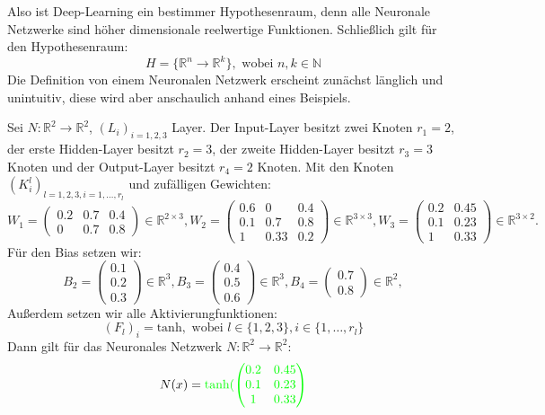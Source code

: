 \documentclass[12pt,letterpaper,ngerman]{article}
\begin{document}
Also ist Deep-Learning ein bestimmer Hypothesenraum, denn 
alle Neuronale Netzwerke sind höher dimensionale reelwertige Funktionen. 
Schließlich gilt für den Hypothesenraum:
\[
  H = \{\mathbb{R}^n \to \mathbb{R}^k\}, \text{ wobei } n,k \in \mathbb{N}
\]
Die Definition von einem Neuronalen Netzwerk erscheint zunächst länglich und unintuitiv, diese
wird aber anschaulich anhand eines Beispiels.
\begin{example}
  Sei $N: \mathbb{R}^2 \to \mathbb{R}^2$, $(L_i)_{i=1,2,3}$ Layer.
  Der Input-Layer besitzt zwei Knoten $r_1 = 2$, der erste
  Hidden-Layer besitzt $r_2 = 3$, der zweite Hidden-Layer besitzt
  $r_3 = 3$ Knoten und der Output-Layer besitzt $r_4 = 2$ Knoten.
  Mit den Knoten $(K^l_i)_{l=1,2,3, i = 1, \dots, r_l}$ und zufälligen
  Gewichten:
  \[
    W_1 = \begin{pmatrix} 0.2 & 0.7 & 0.4 \\ 0 & 0.7 & 0.8 \end{pmatrix} 
    \in \mathbb{R}^{2 \times 3},
    W_2 = \begin{pmatrix} 0.6 & 0 & 0.4 \\ 0.1 & 0.7 & 0.8 \\ 1 & 0.33 & 0.2 \end{pmatrix}
    \in \mathbb{R}^{3 \times 3},
    W_3 = \begin{pmatrix} 0.2 & 0.45 \\ 0.1 & 0.23 \\ 1 & 0.33 \end{pmatrix}
    \in \mathbb{R}^{3 \times 2}.
  \]
  Für den Bias setzen wir:
  \[
    B_2 = \begin{pmatrix} 0.1 \\ 0.2 \\ 0.3\end{pmatrix} \in \mathbb{R}^3,
    B_3 = \begin{pmatrix} 0.4 \\ 0.5 \\ 0.6\end{pmatrix} \in \mathbb{R}^3,
    B_4 = \begin{pmatrix} 0.7 \\ 0.8 \end{pmatrix} \in \mathbb{R}^2,
  \]
  Außerdem setzen wir alle Aktivierungfunktionen:
  \[
    (F_{l})_i = \text{tanh}, \text{ wobei } l \in \{ 1, 2, 3\},
      i \in \{1, \dots, r_l\}
  \]
  Dann gilt für das Neuronales Netzwerk $N: \mathbb{R}^2 \to \mathbb{R}^2$:
  \[
    N(x) = 
    {\color{green}
    \text{tanh}(\begin{pmatrix} 0.2 & 0.45 \\ 0.1 & 0.23 \\ 1 & 0.33 \end{pmatrix}
}\]
\end{example}
\end{document}
